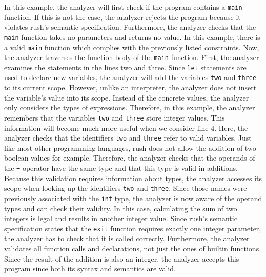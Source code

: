 In this example, the analyzer will first check if the program contains a \texttt{main} function.
If this is not the case, the analyzer rejects the program because it violates rush's semantic specification.
Furthermore, the analyzer checks that the \texttt{main} function takes no parameters and returns no value. In this
example, there is a valid \texttt{main} function which complies with the previously listed constraints. Now, the analyzer traverses the
function body of the \texttt{main} function. First, the analyzer examines the statements in the lines two and three.
Since \texttt{let} statements are used to declare
new variables, the analyzer will add the variables \texttt{two} and \texttt{three} to its
current scope. However, unlike an interpreter, the analyzer does not insert the
variable's value into its scope. Instead of the concrete values, the analyzer
only considers the types of expressions. Therefore, in this example, the
analyzer remembers that the variables \texttt{two} and \texttt{three} store integer values.
This information will become much more useful when we consider line 4. Here, the
analyzer checks that the identifiers \texttt{two} and \texttt{three} refer to valid variables.
Just like most other programming languages, rush does not allow the addition
of two boolean values for example. Therefore, the analyzer checks that the operands
of the \texttt{+} operator have the same type and that this type is valid in additions.
Because this validation requires information about types, the analyzer accesses
its scope when looking up the identifiers \texttt{two} and \texttt{three}. Since those names
were previously associated with the \texttt{int} type, the analyzer is now aware of the
operand types and can check their validity. In this case, calculating the
sum of two integers is legal and results in another integer value. Since rush's
semantic specification states that the \texttt{exit} function requires exactly one
integer parameter, the analyzer has to check that it is called correctly.
Furthermore, the analyzer validates all function calls and declarations, not
just the ones of builtin functions. Since the result of the addition is also an
integer, the analyzer accepts this program since both its syntax and semantics
are valid.

